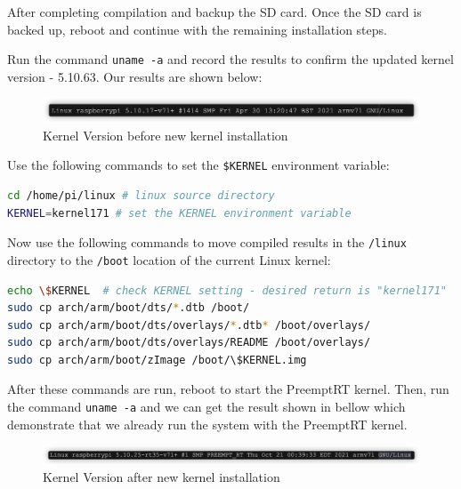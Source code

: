 \documentclass[a4paper,10pt]{article}
\newcommand{\code}[1]{\colorbox{light-gray}{\texttt{#1}}}
\begin{document}
After completing compilation and backup the SD card. Once the SD card is backed up, reboot and continue with the remaining installation steps.

Run the command \code{uname -a} and record the results to confirm the updated kernel version - 5.10.63. Our results are shown below:

\begin{figure}[H]
\centering
\includegraphics[width=0.75\linewidth]{Images/uname1.png}
\caption{Kernel Version before new kernel installation}
\end{figure}

Use the following commands to set the \code{\$KERNEL} environment variable:
\begin{center}
\begin{lstlisting}[language=bash, label=code:code14] 
cd /home/pi/linux # linux source directory
KERNEL=kernel171 # set the KERNEL environment variable
\end{lstlisting}
\end{center}\vspace{-1em}



Now use the following commands to move compiled results in the \code{/linux} directory to the \code{/boot} location of the current Linux kernel:

\begin{center}
\begin{lstlisting}[language=bash, label=code:code15] 
echo \$KERNEL  # check KERNEL setting - desired return is "kernel171"
sudo cp arch/arm/boot/dts/*.dtb /boot/
sudo cp arch/arm/boot/dts/overlays/*.dtb* /boot/overlays/
sudo cp arch/arm/boot/dts/overlays/README /boot/overlays/
sudo cp arch/arm/boot/zImage /boot/\$KERNEL.img
\end{lstlisting}
\end{center}\vspace{-1em}

After these commands are run, reboot to start the PreemptRT kernel. Then, run the command \code{uname -a} and we can get the result shown in bellow which demonstrate that we already run the system with the PreemptRT kernel.
\begin{figure}[H]
\centering
\includegraphics[width=\linewidth]{Images/uname2.png}
\caption{Kernel Version after new kernel installation}
\end{figure}
\end{document}
